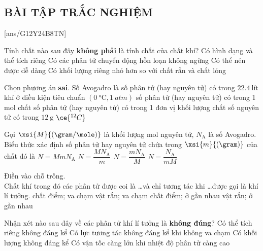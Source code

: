 \subsection{BÀI TẬP TRẮC NGHIỆM}
[ans/G12Y24B8TN]
\begin{ex}
	Tính chất nào sau đây \textbf{không phải} là tính chất của chất khí?
	\choice
	{\True Có hình dạng và thể tích riêng}
	{Có các phân tử chuyển động hỗn loạn không ngừng}
	{Có thể nén được dễ dàng}
	{Có khối lượng riêng nhỏ hơn so với chất rắn và chất lỏng}
	\loigiai{}
\end{ex}
\begin{ex}
	Chọn phương án \textbf{sai}. Số Avogadro là
	\choice
	{số phân tử (hay nguyên tử) có trong $\SI{22.4}{\text{lít}}$ khí ở điều kiện tiêu chuẩn $\left(\SI{0}{\celsius}, \SI{1}{atm}\right)$}
	{số phân tử (hay nguyên tử) có trong 1 mol chất}
	{\True số phân tử (hay nguyên tử) có trong 1 đơn vị khối lượng chất}
	{số nguyên tử có trong $\SI{12}{\gram}$ $\ce{^{12}C}$}
	\loigiai{}
\end{ex}
\begin{ex}
Gọi $\xsi{M}{(\gram/\mole)}$ là khối lượng mol nguyên tử, $N_\text{A}$ là số Avogadro. Biểu thức xác định số phân tử hay nguyên tử chứa trong $\xsi{m}{(\gram)}$ của chất đó là	
	\choice
	{$N=MmN_\text{A}$}
	{$N=\dfrac{MN_\text{A}}{m}$}
	{\True $N=\dfrac{mN_\text{A}}{M}$}
	{$N=\dfrac{N_\text{A}}{mM}$}
	\loigiai{}
\end{ex}
\begin{ex}
Điền vào chỗ trống.\\
Chất khí trong đó các phân tử được coi là \dots và chỉ tương tác khi \dots được gọi là khí lí tưởng.	
	\choice
	{\True chất điểm; va chạm}
	{vật rắn; va chạm}
	{chất điểm; ở gần nhau}
	{vật rắn; ở gần nhau}
	\loigiai{}
\end{ex}
\begin{ex}
	Nhận xét nào sau đây về các phân tử khí lí tưởng là \textbf{không đúng}?
	\choice
	{Có thể tích riêng không đáng kể}
	{Có lực tương tác không đáng kể khi không va chạm}
	{\True Có khối lượng không đáng kể}
	{Có vận tốc càng lớn khi nhiệt độ phân tử càng cao}
	\loigiai{}
\end{ex}
